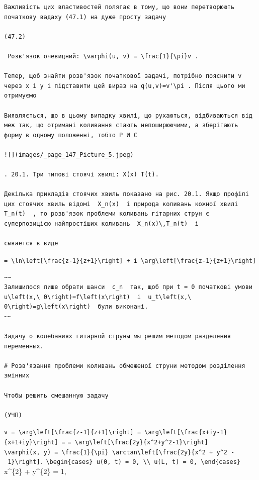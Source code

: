 \documentclass[
  ukrainian,
]{article}
\begin{document}
\begin{verbatim}
Важливість цих властивостей полягає в тому, що вони перетворюють початкову вадаху (47.1) на дуже просту задачу

(47.2)

 Розв'язок очевидний: \varphi(u, v) = \frac{1}{\pi}v .

Тепер, щоб знайти розв'язок початкової задачі, потрібно пояснити v через x і y і підставити цей вираз на q(u,v)=v'\pi . Після цього ми отримуємо

Виявляється, що в цьому випадку хвилі, що рухаються, відбиваються від меж так, що отримані коливання стають непоширюючими, а зберігають форму в одному положенні, тобто Р И С

![](images/_page_147_Picture_5.jpeg)

. 20.1. Три типові стоячі хвилі: X(x) T(t).

Декілька прикладів стоячих хвиль показано на рис. 20.1. Якщо профілі цих стоячих хвиль відомі  X_n(x)  і природа коливань кожної хвилі  T_n(t)  , то розв'язок проблеми коливань гітарних струн є суперпозицією найпростіших коливань  X_n(x)\,T_n(t)  і

сывается в виде
\end{verbatim}

\texttt{=\ \textbackslash{}ln\textbackslash{}left{[}\textbackslash{}frac\{z-1\}\{z+1\}\textbackslash{}right{]}\ +\ i\ \textbackslash{}arg\textbackslash{}left{[}\textbackslash{}frac\{z-1\}\{z+1\}\textbackslash{}right{]}}

\begin{verbatim}
~~
Залишилося лише обрати шанси  c_n  так, щоб при t = 0 початкові умови  u\left(x,\ 0\right)=f\left(x\right)  і  u_t\left(x,\ 0\right)=g\left(x\right)  були виконані.
~~

Задачу о колебаниях гитарной струны мы решим методом разделения переменных.

# Розв'язання проблеми коливань обмеженої струни методом розділення змінних

Чтобы решить смешанную задачу

(УЧП)
\end{verbatim}

\texttt{v\ =\ \textbackslash{}arg\textbackslash{}left{[}\textbackslash{}frac\{z-1\}\{z+1\}\textbackslash{}right{]}\ =\ \textbackslash{}arg\textbackslash{}left{[}\textbackslash{}frac\{x+iy-1\}\{x+1+iy\}\textbackslash{}right{]}\ =}
\texttt{=\ \textbackslash{}arg\textbackslash{}left{[}\textbackslash{}frac\{2y\}\{x\^{}2+y\^{}2-1\}\textbackslash{}right{]}}
\texttt{\textbackslash{}varphi(x,\ y)\ =\ \textbackslash{}frac\{1\}\{\textbackslash{}pi\}\ \textbackslash{}arctan\textbackslash{}left{[}\textbackslash{}frac\{2y\}\{x\^{}2\ +\ y\^{}2\ -\ 1\}\textbackslash{}right{]}.}
\texttt{\textbackslash{}begin\{cases\}\ u(0,\ t)\ =\ 0,\ \textbackslash{}\textbackslash{}\ u(L,\ t)\ =\ 0,\ \textbackslash{}end\{cases\}}
x\^{}\{2\} + y\^{}\{2\} = 1,
\end{document}
